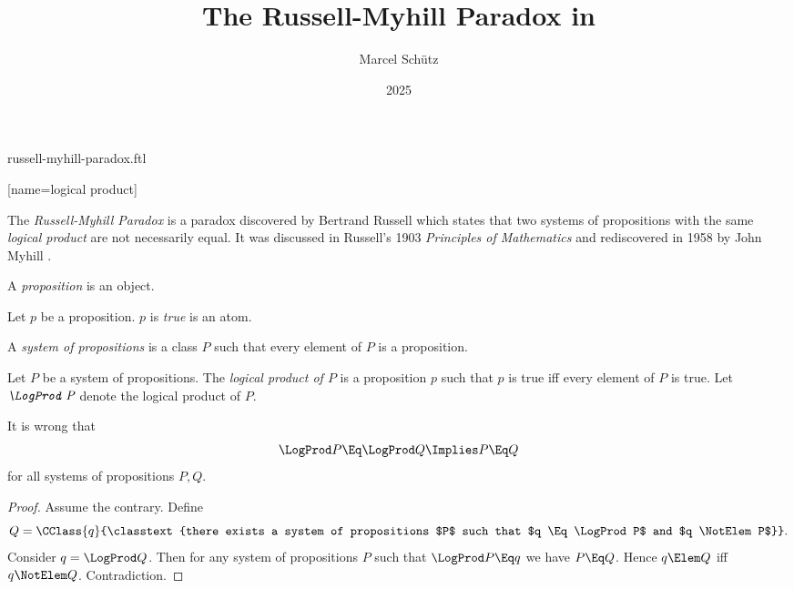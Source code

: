 \documentclass{stex}
\title{The Russell-Myhill Paradox in \Naproche}
\author{Marcel Schütz}
\date{2025}
\begin{document}
\begin{smodule}{russell-myhill-paradox.ftl}


[name=logical product]{\sqcap\,}

\maketitle

\noindent The \emph{Russell-Myhill Paradox} is a paradox discovered by 
Bertrand Russell which states that two systems of propositions with the same 
\emph{logical product} are not necessarily equal.
It was discussed in Russell's 1903 \emph{Principles of Mathematics}
\cite[Appendix B]{Russell1903} and rediscovered in 1958 by John Myhill
\cite{Myhill1958}.

\begin{forthel}
  \begin{signature*}[for=proposition]
    A \emph{proposition} is an object.
  \end{signature*}

  \begin{signature*}[for=true]
    Let $p$ be a proposition.
    $p$ is \emph{true} is an atom.
  \end{signature*}

  \begin{definition*}[for=system of propositions]
    A \emph{system of propositions} is a class $P$ such that every element of $P$ is a proposition.
  \end{definition*}

  \begin{signature*}[for=logical product]
    Let $P$ be a system of propositions.
    The \emph{logical product of $P$} is a proposition $p$ such that $p$ is true iff every element of $P$ is true.
    Let $\emph{\LogProd P}$ denote the logical product of $P$.
  \end{signature*}
  
  \begin{theorem*}[title=Russell-Myhill Paradox,name=Russell-Myhill Paradox]
    It is wrong that
    \[ \LogProd P \Eq \LogProd Q \Implies P \Eq Q \]
    for all systems of propositions $P, Q$.
  \end{theorem*}
  \begin{proof}
    Assume the contrary.
    Define
    \[ Q = \CClass{q}{\classtext{there exists a system of propositions $P$ such
    that $q \Eq \LogProd P$  and $q \NotElem P$}}. \]
    Consider $q = \LogProd Q$.
    Then for any system of propositions $P$ such that $\LogProd P \Eq q$ we have $P \Eq Q$.
    Hence $q \Elem Q$ iff $q \NotElem Q$.
    Contradiction.
  \end{proof}
\end{forthel}

\printbibliography
{}
\end{smodule}
\end{document}
